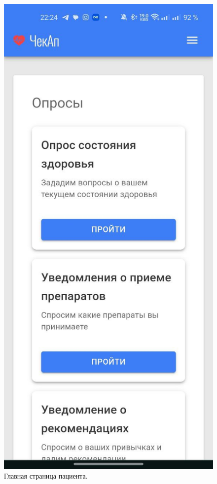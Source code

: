\begin{figure}[htbp]
    \centering
    \includegraphics[height=\dimexpr\textheight/3\relax]{images/screenshots/main_page_patient}
    \caption{Главная страница пациента.}
    \label{fig:figure53}
\end{figure}

